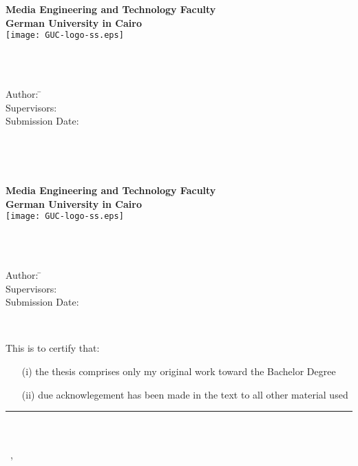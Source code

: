 \newcommand{\titlePage}{

  \thispagestyle{empty}
  \begin{center}
    \textbf{Media Engineering and Technology Faculty}\\[1mm]
    \textbf{German University in Cairo}\\[1mm]
    \texttt{[image: GUC-logo-ss.eps]}

    \vspace{2cm}
    \doublespacing
    {\Huge \textbf{\titleOfThesisOne}}\\
    \singlespacing
    \vspace{2cm}
    {\large \textbf{\typeOfThesis}}\\

    \vfill
    \parbox{1cm}{
      \begin{large}
        \begin{tabbing}
          Author: \hspace{2cm}
          \=\authorOfThesis\\[2mm]
          Supervisors:
          \>\supervisorOne\\[2mm]
          Submission Date:
          \>\submissionDate\\
        \end{tabbing}
      \end{large}
    }\\
  \end{center}
  \clearpage
}
\titlePage
\thispagestyle{empty}\ \clearpage
\titlePage
\thispagestyle{empty}
This is to certify that:
\begin{itemize}
  \item[(i)] the thesis comprises only my original work toward the Bachelor Degree
  \item[(ii)] due acknowlegement has been made in the text to all other material used
\end{itemize}

\vspace{2cm}
\begin{flushright}
  \rule[0mm]{6cm}{0.2mm}\\
  \authorOfThesis\\
  \submissionDay~\submissionMonth,~\submissionYear\\
\end{flushright}
\clearpage
